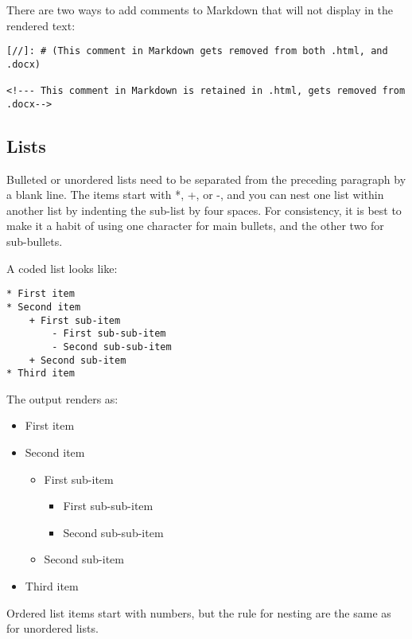 \documentclass[
]{article}
\providecommand{\tightlist}{%
  \setlength{\itemsep}{0pt}\setlength{\parskip}{0pt}}
\begin{document}
There are two ways to add comments to Markdown that will not display in
the rendered text:

\begin{verbatim}
[//]: # (This comment in Markdown gets removed from both .html, and .docx)

<!--- This comment in Markdown is retained in .html, gets removed from .docx-->
\end{verbatim}

\hypertarget{lists}{%
\subsection{Lists}\label{lists}}

Bulleted or unordered lists need to be separated from the preceding
paragraph by a blank line. The items start with *, +, or -, and you can
nest one list within another list by indenting the sub-list by four
spaces. For consistency, it is best to make it a habit of using one
character for main bullets, and the other two for sub-bullets.

A coded list looks like:

\begin{verbatim}
* First item
* Second item
    + First sub-item
        - First sub-sub-item
        - Second sub-sub-item
    + Second sub-item
* Third item
\end{verbatim}

The output renders as:

\begin{itemize}
\tightlist
\item
  First item
\item
  Second item

  \begin{itemize}
  \tightlist
  \item
    First sub-item

    \begin{itemize}
    \tightlist
    \item
      First sub-sub-item
    \item
      Second sub-sub-item
    \end{itemize}
  \item
    Second sub-item
  \end{itemize}
\item
  Third item
\end{itemize}

Ordered list items start with numbers, but the rule for nesting are the
same as for unordered lists.
\end{document}

